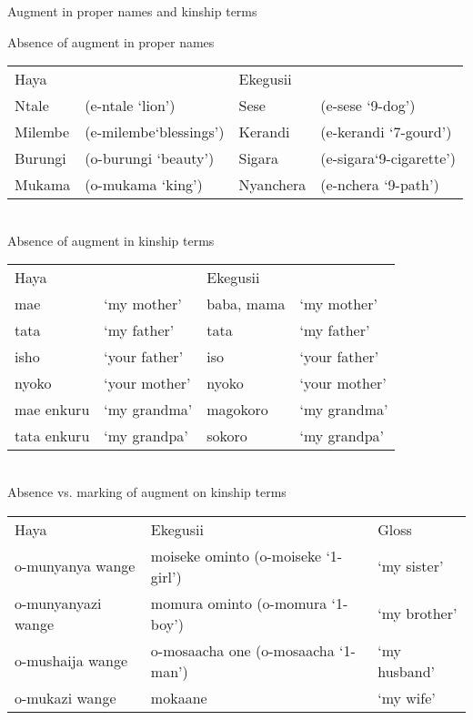 \documentclass[output=paper]{langscibook}
\begin{document}
\begin{exe}
\ex Augment in proper names and kinship terms 
\label{hayagusii9}
\begin{xlist}
\ex Absence of augment in proper names \\
\begin{tabular}{p{1.1cm} p{3.5cm} p{1.3cm} p{3.4cm}}  
  Haya	& 			&		Ekegusii & \\
Ntale 	&	(e-ntale ‘lion’)	    &     Sese & (e-sese ‘9-dog’) \\
Milembe &	(e-milembe`blessings')	& Kerandi & (e-kerandi ‘7-gourd’) \\	
Burungi &	(o-burungi ‘beauty’)	&	Sigara & (e-sigara‘9-cigarette’) \\	
Mukama &	(o-mukama ‘king’)	&	Nyanchera & (e-nchera ‘9-path’) \\

\end{tabular}
\\
\ex Absence of augment in kinship terms \\
\begin{tabular}{p{2cm} p{3cm} p{2cm} p{3cm}}  
Haya & & Ekegusii & \\
mae & `my mother' &		baba, mama  &`my mother' \\
tata 	& `my father' &		tata  &`my father' \\
	isho & `your father' &	iso  & `your father'\\
nyoko   & `your mother' &  	nyoko & `your mother' \\
mae enkuru	& `my grandma' &	magokoro & `my grandma' \\
tata enkuru	& `my grandpa' &	sokoro & `my grandpa'\\
\end{tabular}
\\
\ex Absence vs. marking of augment on kinship terms \\
\begin{tabular}{p{3.4cm} p{3cm} p{2.5cm}}   
   Haya &  Ekegusii & Gloss \\
   o-munyanya wange	&	moiseke ominto  (o-moiseke ‘1-girl’) & `my sister' \\
   o-munyanyazi wange	&	momura ominto       (o-momura ‘1-boy’) & `my brother'\\
   o-mushaija wange	 &	o-mosaacha one   (o-mosaacha ‘1-man’) & `my husband'\\
   o-mukazi wange	&	mokaane  & `my wife'\\
\end{tabular}

\end{xlist}
\end{exe}
\end{document}
